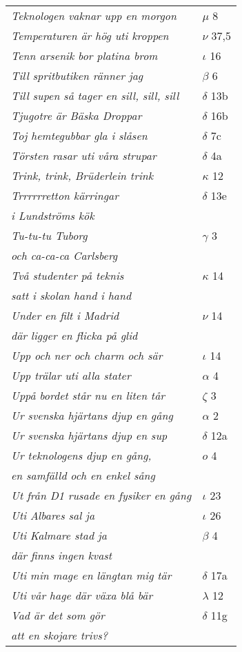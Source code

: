 \documentclass[a6paper,10pt]{article}
\begin{document}
\newpage
\begin{table}[!h]
\begin{tabular}{l l}
\textit{Teknologen vaknar upp en morgon}    &$\mu$ 8\\
\textit{Temperaturen är hög uti kroppen}	&$\nu$ 37,5\\
\textit{Tenn arsenik bor platina brom}	&$\iota$ 16\\
\textit{Till spritbutiken ränner jag}	&$\beta$ 6\\
\textit{Till supen så tager en sill, sill, sill}	&$\delta$ 13b\\
\textit{Tjugotre är Bäska Droppar}	&$\delta$ 16b\\
\textit{Toj hemtegubbar gla i slåsen}	&$\delta$ 7c\\
\textit{Törsten rasar uti våra strupar}	&$\delta$ 4a\\
\textit{Trink, trink, Brüderlein trink}	&$\kappa$ 12\\
\textit{Trrrrrretton kärringar}	&$\delta$ 13e\\
\textit{i Lundströms kök} &\\
\textit{Tu-tu-tu Tuborg}	&$\gamma$ 3\\
\textit{och ca-ca-ca Carlsberg} &\\
\textit{Två studenter på teknis}	&$\kappa$ 14\\
\textit{satt i skolan hand i hand} &\\
\textit{Under en filt i Madrid}	&$\nu$ 14\\
\textit{där ligger en flicka på glid} &\\
\textit{Upp och ner och charm och sär}	&$\iota$ 14\\
\textit{Upp trälar uti alla stater}	&$\alpha$ 4\\
\textit{Uppå bordet står nu en liten tår}	&$\zeta$ 3\\
\textit{Ur svenska hjärtans djup en gång}	&$\alpha$ 2\\
\textit{Ur svenska hjärtans djup en sup}	&$\delta$ 12a\\
\textit{Ur teknologens djup en gång,}	&$o$ 4\\
\textit{en samfälld och en enkel sång} &\\
\textit{Ut från D1 rusade en fysiker en gång} &$\iota$ 23\\
\textit{Uti Albares sal ja} &$\iota$ 26\\
\textit{Uti Kalmare stad ja}	&$\beta$ 4\\
\textit{där finns ingen kvast} &\\
\textit{Uti min mage en längtan mig tär}	&$\delta$ 17a\\
\textit{Uti vår hage där växa blå bär}	&$\lambda$ 12\\
\textit{Vad är det som gör}	&$\delta$ 11g\\
\textit{att en skojare trivs?} &\\
\end{tabular}
\end{table}
\end{document}
